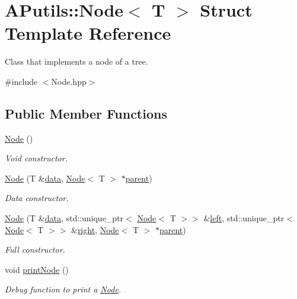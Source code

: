 \hypertarget{struct_a_putils_1_1_node}{}\section{A\+Putils\+:\+:Node$<$ T $>$ Struct Template Reference}
\label{struct_a_putils_1_1_node}


Class that implements a node of a tree.  




{\ttfamily \#include $<$Node.\+hpp$>$}

\subsection*{Public Member Functions}
\begin{DoxyCompactItemize}
\item 
\hyperlink{struct_a_putils_1_1_node_a545892e6abb32d0c21c0f599cea87aa3}{Node} ()
\begin{DoxyCompactList}\small\item\em Void constructor. \end{DoxyCompactList}\item 
\hyperlink{struct_a_putils_1_1_node_ae7dcf8a32c03fcf4424def1db9dc9901}{Node} (T \&\hyperlink{struct_a_putils_1_1_node_aaeaf283a76b1095627efa92a98199600}{data}, \hyperlink{struct_a_putils_1_1_node}{Node}$<$ T $>$ $\ast$\hyperlink{struct_a_putils_1_1_node_a0e9effc20e8a7a0e0ce2a37412b3c3b5}{parent})
\begin{DoxyCompactList}\small\item\em Data constructor. \end{DoxyCompactList}\item 
\hyperlink{struct_a_putils_1_1_node_a2803ca208a3b7c31d6df7fcefec7b5b6}{Node} (T \&\hyperlink{struct_a_putils_1_1_node_aaeaf283a76b1095627efa92a98199600}{data}, std\+::unique\+\_\+ptr$<$ \hyperlink{struct_a_putils_1_1_node}{Node}$<$ T $>$$>$ \&\hyperlink{struct_a_putils_1_1_node_ac2536ffddf03b9680947696c234653f4}{left}, std\+::unique\+\_\+ptr$<$ \hyperlink{struct_a_putils_1_1_node}{Node}$<$ T $>$$>$ \&\hyperlink{struct_a_putils_1_1_node_ad42ab35caa0847c2c6cc16cc5d9f1a36}{right}, \hyperlink{struct_a_putils_1_1_node}{Node}$<$ T $>$ $\ast$\hyperlink{struct_a_putils_1_1_node_a0e9effc20e8a7a0e0ce2a37412b3c3b5}{parent})
\begin{DoxyCompactList}\small\item\em Full constructor. \end{DoxyCompactList}\item 
void \hyperlink{struct_a_putils_1_1_node_aed063f9c03ec7899e405062be5a0b702}{print\+Node} ()
\begin{DoxyCompactList}\small\item\em Debug function to print a {\ttfamily \hyperlink{struct_a_putils_1_1_node}{Node}}. \end{DoxyCompactList}\end{DoxyCompactItemize}
